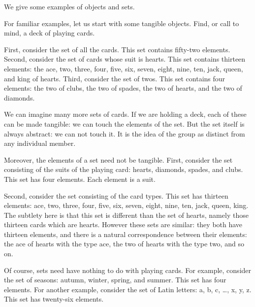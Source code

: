 
\sbasic



\sstart



We give some
examples
of objects
and sets.


For familiar examples,
let us start
with some tangible
objects.
Find, or call to
mind,
a deck
of playing cards.

First, consider
the set of all
the cards.
This set contains
fifty-two elements.
Second, consider
the set of cards
whose suit is hearts.
This set contains
thirteen elements:
the ace, two, three, four, five,
six, seven, eight, nine, ten,
jack, queen, and
king of hearts.
Third, consider
the set of twos.
This set contains
four elements:
the two of clubs,
the two of spades,
the two of hearts,
and the two of diamonds.

We can imagine many
more sets of cards.
If we are holding a deck,
each of these can be
made tangible: we can
touch the elements of
the set.
But the set itself
is always abstract:
we can not touch it.
It is the idea of the
group as distinct from
any individual member.

Moreover, the
elements of a set
need not be tangible.
First, consider the set
consisting of the suits of
the playing card:
hearts, diamonds, spades, and clubs.
This set has four elements.
Each element is a suit.

Second, consider the set
consisting of the card types.
This set has thirteen elements:
ace, two, three, four, five,
six, seven, eight, nine, ten,
jack, queen, king.
The subtlety here is that
this set is different than
the set of hearts, namely
those thirteen cards which are
hearts.
However these sets are
similar: they both have thirteen
elements, and there is a natural
correspondence between their
elements: the ace of hearts
with the type ace, the two
of hearts with the type two,
and so on.

Of course, sets need have nothing to
do with playing cards.
For example, consider the set of
seasons: autumn, winter, spring,
and summer.
This set has four elements.
For another example,
consider the set of Latin letters:
a, b, c, \dots, x, y, z.
This set has twenty-six elements.


\strats
